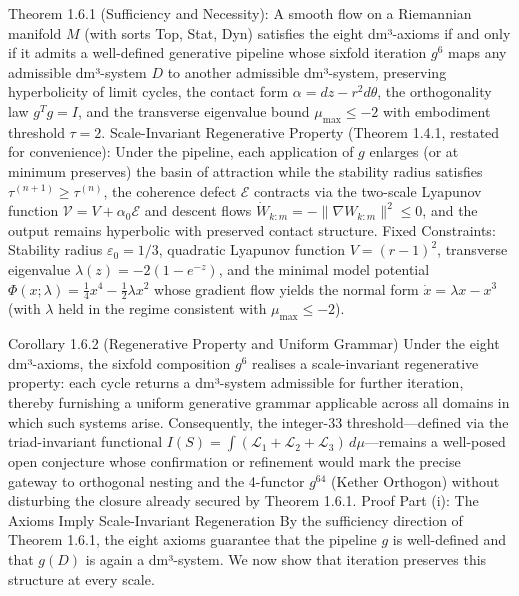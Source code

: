 Theorem 1.6.1 (Sufficiency and Necessity): A smooth flow on a Riemannian manifold $  M  $ (with sorts Top, Stat, Dyn) satisfies the eight dm³-axioms if and only if it admits a well-defined generative pipeline whose sixfold iteration $  g^6  $ maps any admissible dm³-system $  D  $ to another admissible dm³-system, preserving hyperbolicity of limit cycles, the contact form $  \alpha = dz - r^2 d\theta  $, the orthogonality law $  g^T g = I  $, and the transverse eigenvalue bound $  \mu_{\max} \le -2  $ with embodiment threshold $  \tau = 2  $.
Scale-Invariant Regenerative Property (Theorem 1.4.1, restated for convenience): Under the pipeline, each application of $  g  $ enlarges (or at minimum preserves) the basin of attraction while the stability radius satisfies $  \tau^{(n+1)} \ge \tau^{(n)}  $, the coherence defect $  \mathcal{E}  $ contracts via the two-scale Lyapunov function $  \mathcal{V} = V + \alpha_0 \mathcal{E}  $ and descent flows $  \dot{W}_{k:m} = -\|\nabla W_{k:m}\|^2 \le 0  $, and the output remains hyperbolic with preserved contact structure.
Fixed Constraints: Stability radius $  \varepsilon_0 = 1/3  $, quadratic Lyapunov function $  V = (r-1)^2  $, transverse eigenvalue $  \lambda(z) = -2(1-e^{-z})  $, and the minimal model potential $  \Phi(x;\lambda) = \frac14 x^4 - \frac12 \lambda x^2  $ whose gradient flow yields the normal form $  \dot{x} = \lambda x - x^3  $ (with $  \lambda  $ held in the regime consistent with $  \mu_{\max} \le -2  $).

Corollary 1.6.2 (Regenerative Property and Uniform Grammar)
Under the eight dm³-axioms, the sixfold composition $  g^6  $ realises a scale-invariant regenerative property: each cycle returns a dm³-system admissible for further iteration, thereby furnishing a uniform generative grammar applicable across all domains in which such systems arise. Consequently, the integer-33 threshold—defined via the triad-invariant functional $  I(S) = \int (\mathcal{L}_1 + \mathcal{L}_2 + \mathcal{L}_3) \, d\mu  $—remains a well-posed open conjecture whose confirmation or refinement would mark the precise gateway to orthogonal nesting and the 4-functor $  g^{64}  $ (Kether Orthogon) without disturbing the closure already secured by Theorem 1.6.1.
Proof
Part (i): The Axioms Imply Scale-Invariant Regeneration
By the sufficiency direction of Theorem 1.6.1, the eight axioms guarantee that the pipeline $  g  $ is well-defined and that $  g(D)  $ is again a dm³-system. We now show that iteration preserves this structure at every scale.

